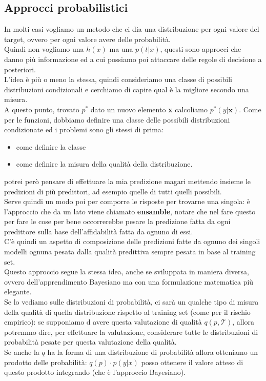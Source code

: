 \documentclass[12pt, oneside]{extbook}
\begin{document}
\subsection{Approcci probabilistici}
In molti casi vogliamo un metodo che ci dia una distribuzione per ogni valore del target, ovvero per ogni valore avere delle probabilità.\\Quindi non vogliamo una $h(x)$ ma una $p(t|x)$, questi sono approcci che danno più informazione ed a cui possiamo poi attaccare delle regole di decisione a posteriori.\\L'idea è più o meno la stessa, quindi consideriamo una classe di possibili distribuzioni condizionali e cerchiamo di capire qual è la migliore secondo una misura.\\A questo punto, trovato $p^*$ dato un nuovo elemento \textbf{x} calcoliamo $p^*(y | \boldsymbol{x})$. Come per le funzioni, dobbiamo definire una classe delle possibili distribuzioni condizionate ed i problemi sono gli stessi di prima:
\begin{itemize}
	\item come definire la classe
	\item come definire la misura della qualità della distribuzione.
\end{itemize}
potrei però pensare di effettuare la mia predizione magari mettendo insieme le predizioni di più predittori, ad esempio quelle di tutti quelli possibili.\\Serve quindi un modo poi per comporre le risposte per trovarne una singola: è l'approccio che da un lato viene chiamato \textbf{ensamble}, notare che nel fare questo per fare le cose per bene occorrerebbe pesare la predizione fatta da ogni predittore sulla base dell'affidabilità fatta da ognuno di essi.\\C'è quindi un aspetto di composizione delle predizioni fatte da ognuno dei singoli modelli ognuna pesata dalla qualità predittiva sempre pesata in base al training set.\\Questo approccio segue la stessa idea, anche se sviluppata in maniera diversa, ovvero dell'apprendimento Bayesiano ma con una formulazione matematica più elegante.\\Se lo vediamo sulle distribuzioni di probabilità, ci sarà un qualche tipo di misura della qualità di quella distribuzione rispetto al training set (come per il rischio empirico): se supponiamo d avere questa valutazione di qualità $q(p, \mathscr{T})$, allora potremmo dire, per effettuare la valutazione, considerare tutte le distribuzioni di probabilità pesate per questa valutazione della qualità.\\Se anche la $q$ ha la forma di una distribuzione di probabilità allora otteniamo un prodotto delle probabilità: $q(p) \cdot p(y|x)$ posso ottenere il valore atteso di questo prodotto integrando (che è l'approccio Bayesiano).
\end{document}
